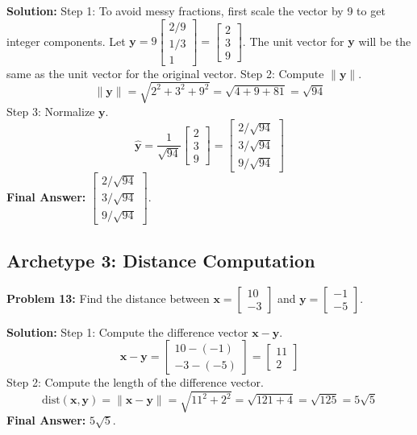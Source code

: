 \documentclass[11pt, letterpaper]{article}
\theoremstyle{definition}
\theoremstyle{remark}
\begin{document}
\textbf{Solution:}
Step 1: To avoid messy fractions, first scale the vector by 9 to get integer components. Let $\mathbf{y} = 9 \begin{bmatrix} 2/9 \\ 1/3 \\ 1 \end{bmatrix} = \begin{bmatrix} 2 \\ 3 \\ 9 \end{bmatrix}$. The unit vector for $\mathbf{y}$ will be the same as the unit vector for the original vector.
Step 2: Compute $\|\mathbf{y}\|$.
\[ \|\mathbf{y}\| = \sqrt{2^2 + 3^2 + 9^2} = \sqrt{4 + 9 + 81} = \sqrt{94} \]
Step 3: Normalize $\mathbf{y}$.
\[ \mathbf{\hat{y}} = \frac{1}{\sqrt{94}} \begin{bmatrix} 2 \\ 3 \\ 9 \end{bmatrix} = \begin{bmatrix} 2/\sqrt{94} \\ 3/\sqrt{94} \\ 9/\sqrt{94} \end{bmatrix} \]
\textbf{Final Answer:} $\begin{bmatrix} 2/\sqrt{94} \\ 3/\sqrt{94} \\ 9/\sqrt{94} \end{bmatrix}$.

\subsection{Archetype 3: Distance Computation}

\textbf{Problem 13:} Find the distance between $\mathbf{x} = \begin{bmatrix} 10 \\ -3 \end{bmatrix}$ and $\mathbf{y} = \begin{bmatrix} -1 \\ -5 \end{bmatrix}$.

\textbf{Solution:}
Step 1: Compute the difference vector $\mathbf{x} - \mathbf{y}$.
\[ \mathbf{x} - \mathbf{y} = \begin{bmatrix} 10 - (-1) \\ -3 - (-5) \end{bmatrix} = \begin{bmatrix} 11 \\ 2 \end{bmatrix} \]
Step 2: Compute the length of the difference vector.
\[ \text{dist}(\mathbf{x}, \mathbf{y}) = \|\mathbf{x} - \mathbf{y}\| = \sqrt{11^2 + 2^2} = \sqrt{121 + 4} = \sqrt{125} = 5\sqrt{5} \]
\textbf{Final Answer:} $5\sqrt{5}$.
\end{document}
